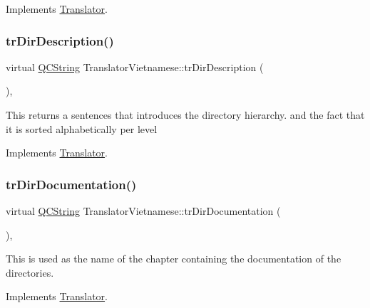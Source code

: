Implements \mbox{\hyperlink{class_translator}{Translator}}.

\mbox{\label{class_translator_vietnamese_a704e01af5383836a98fbe7ef27083114}} 
\subsubsection{\texorpdfstring{trDirDescription()}{trDirDescription()}}
{\footnotesize\ttfamily virtual \mbox{\hyperlink{class_q_c_string}{Q\+C\+String}} Translator\+Vietnamese\+::tr\+Dir\+Description (\begin{DoxyParamCaption}{ }\end{DoxyParamCaption})\hspace{0.3cm}{\ttfamily [inline]}, {\ttfamily [virtual]}}

This returns a sentences that introduces the directory hierarchy. and the fact that it is sorted alphabetically per level 

Implements \mbox{\hyperlink{class_translator}{Translator}}.

\mbox{\label{class_translator_vietnamese_a482af304c4079f98fb1db63abc395737}} 
\subsubsection{\texorpdfstring{trDirDocumentation()}{trDirDocumentation()}}
{\footnotesize\ttfamily virtual \mbox{\hyperlink{class_q_c_string}{Q\+C\+String}} Translator\+Vietnamese\+::tr\+Dir\+Documentation (\begin{DoxyParamCaption}{ }\end{DoxyParamCaption})\hspace{0.3cm}{\ttfamily [inline]}, {\ttfamily [virtual]}}

This is used as the name of the chapter containing the documentation of the directories. 

Implements \mbox{\hyperlink{class_translator}{Translator}}.

\mbox{\label{class_translator_vietnamese_a3f3915e52140601ac949071a43a0850f}} 

